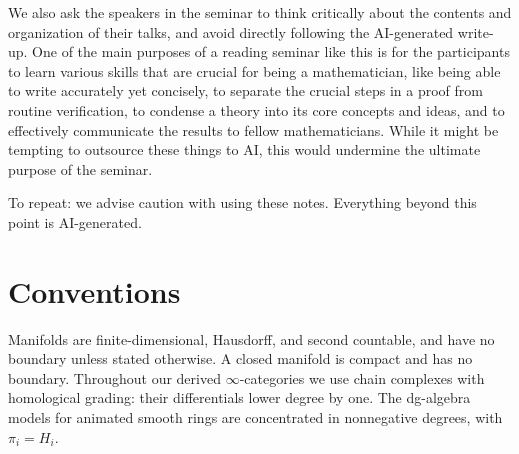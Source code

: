 \documentclass[11pt,a4paper]{book}
\begin{document}
We also ask the speakers in the seminar to think critically about the contents and organization of their talks, and avoid directly following the AI-generated write-up. One of the main purposes of a reading seminar like this is for the participants to learn various skills that are crucial for being a mathematician, like being able to write accurately yet concisely, to separate the crucial steps in a proof from routine verification, to condense a theory into its core concepts and ideas, and to effectively communicate the results to fellow mathematicians. While it might be tempting to outsource these things to AI, this would undermine the ultimate purpose of the seminar.

To repeat: we advise caution with using these notes. Everything beyond this point is AI-generated.

\chapter*{Conventions}

Manifolds are finite-dimensional, Hausdorff, and second countable, and have no boundary unless stated otherwise. A closed manifold is compact and has no boundary. Throughout our derived $\infty$-categories we use chain complexes
with homological grading: their differentials lower degree by one.
The dg-algebra models for animated smooth rings are concentrated in nonnegative degrees, with $\pi_i=H_i$.	

\mainmatter

















\backmatter

\printbibliography
\end{document}
